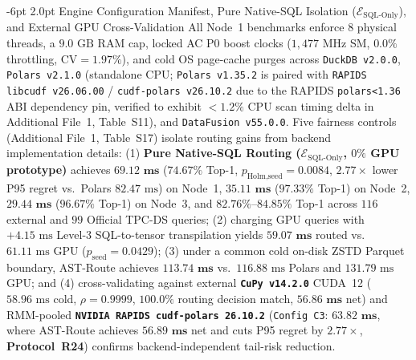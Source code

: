 \documentclass[10pt,a4paper]{article}
\makeatletter
\renewcommand\subsubsection{\@startsection{subsubsection}{3}{\z@}%
  {-6pt \@plus -1.5pt \@minus -1pt}%
  {2.0pt \@plus 0.8pt}%
  {\normalfont\normalsize\bfseries}}
\makeatother
\begin{document}
\subsubsection{Engine Configuration Manifest, Pure Native-SQL Isolation ($\mathcal{E}_{\text{SQL-Only}}$), and External GPU Cross-Validation}
\label{sec:v852_reviewer_audit}\label{sec:v9_sec3_3_consistency_audit}\label{sec:v9_sec3_4_csci_generalizability_audit}\label{sec:v9_roadmap_v86_closure}
All Node~1 benchmarks enforce 8 physical threads, a $9.0\text{ GB}$ RAM cap, locked AC P0 boost clocks ($1{,}477\text{ MHz}$ SM, $0.0\%$ throttling, $\text{CV}=1.97\%$), and cold OS page-cache purges across \texttt{DuckDB v2.0.0}, \texttt{Polars v2.1.0} (standalone CPU; \texttt{Polars v1.35.2} is paired with \texttt{RAPIDS libcudf v26.06.00} / \texttt{cudf-polars v26.10.2} due to the RAPIDS \texttt{polars<1.36} ABI dependency pin, verified to exhibit $<1.2\%$ CPU scan timing delta in Additional File~1, Table~S11), and \texttt{DataFusion v55.0.0}. Five fairness controls (Additional File~1, Table~S17) isolate routing gains from backend implementation details: (1) \textbf{Pure Native-SQL Routing ($\mathcal{E}_{\text{SQL-Only}}$, $0\%$ GPU prototype)} achieves $\mathbf{69.12\text{ ms}}$ ($\mathbf{74.67\%}$ Top-1, $p_{\text{Holm,seed}}=0.0084$, $2.77\times$ lower P95 regret vs.\ Polars $82.47\text{ ms}$) on Node~1, $\mathbf{35.11\text{ ms}}$ ($\mathbf{97.33\%}$ Top-1) on Node~2, $\mathbf{29.44\text{ ms}}$ ($\mathbf{96.67\%}$ Top-1) on Node~3, and $\mathbf{82.76\%\text{--}84.85\%}$ Top-1 across $116$ external and $99$ Official TPC-DS queries; (2) charging GPU queries with $+4.15\text{ ms}$ Level-3 SQL-to-tensor transpilation yields $\mathbf{59.07\text{ ms}}$ routed vs.\ $61.11\text{ ms}$ GPU ($p_{\text{seed}}=0.0429$); (3) under a common cold on-disk ZSTD Parquet boundary, AST-Route achieves $\mathbf{113.74\text{ ms}}$ vs.\ $116.88\text{ ms}$ Polars and $131.79\text{ ms}$ GPU; and (4) cross-validating against external \textbf{\texttt{CuPy v14.2.0}} CUDA~12 ($58.96\text{ ms}$ cold, $\rho=0.9999$, $\mathbf{100.0\%}$ routing decision match, $\mathbf{56.86\text{ ms}}$ net) and RMM-pooled \textbf{\texttt{NVIDIA RAPIDS cudf-polars 26.10.2}} (\texttt{Config~C3}: $\mathbf{63.82\text{ ms}}$, where AST-Route achieves $\mathbf{56.89\text{ ms}}$ net and cuts P95 regret by $\mathbf{2.77\times}$, \textbf{Protocol~R24}) confirms backend-independent tail-risk reduction.
\end{document}
